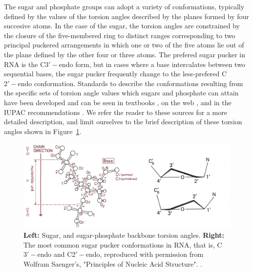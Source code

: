 The sugar and  phosphate groups can adopt a  variety of conformations,
typically defined by the values of the torsion angles described by the
planes formed by four succesive atoms.   In the case of the sugar, the
torsion  angles are constrained  by the  closure of  the five-membered
ring  to  distinct  ranges  corresponding to  two  principal  puckered
arrangements in  which one  or two of  the five  atoms lie out  of the
plane defined  by the other four  or three atoms.   The prefered sugar
pucker in RNA is the C${3'-\textrm{endo}}$ form, but in cases where a
base  intercalates  between two  sequential  bases,  the sugar  pucker
frequently   change   to   the  less-prefered   C${2'-\textrm{endo}}$
conformation.  Standards to  describe the conformations resulting from
the specific sets  of torsion angle values which  sugars and phosphate
can  attain  have  been  developed   and  can  be  seen  in  textbooks
\cite{saenger1984},  on  the  web  \cite{jenaurl}, and  in  the  IUPAC
recommendations  \cite{iupac1983}.   We  refer  the  reader  to  these
sources for  a more detailed  description, and limit ourselves  to the
brief    description    of    these    torsion   angles    shown    in
Figure~\ref{fig:puckersbbone}.

\begin{figure}
\centering
\includegraphics[scale=1.6, angle=0]{Chapter1/torsions.png}
\caption{\textbf{Left:}  Sugar, and  sugar-phosphate  backbone torsion
  angles. \textbf{Right:}  The most common  sugar pucker conformations
  in RNA, that  is, C${3'-\textrm{endo}}$ and C${2'-\textrm{endo}}$,
  reproduced  with permission from  Wolfram Saenger's,  "Principles of
  Nucleic Acid Structure". \cite{saenger1984}.}
\label{fig:puckersbbone}
\end{figure}  



